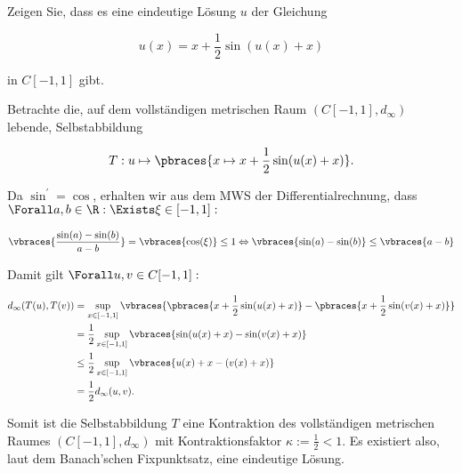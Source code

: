\begin{exercise}

Zeigen Sie, dass es eine eindeutige Lösung $u$ der Gleichung

\begin{equation*}
  u(x) = x + \frac{1}{2}\sin(u(x)+x)
\end{equation*}

in $C[-1,1]$ gibt.

\end{exercise}

\begin{solution}

Betrachte die, auf dem vollständigen metrischen Raum $(C[-1, 1], d_\infty)$ lebende, Selbstabbildung

\begin{equation*}
  T: u \mapsto \pbraces{x \mapsto x + \frac{1}{2}\sin(u(x)+x)}.
\end{equation*}

Da $\sin^\prime = \cos$, erhalten wir aus dem MWS der Differentialrechnung, dass $\Forall a, b \in \R: \Exists \xi \in [-1,1]:$

\begin{align*}
  \vbraces{\frac{\sin(a)-\sin(b)}{a-b}} = \vbraces{\cos(\xi)} \leq 1 \Leftrightarrow
  \vbraces{\sin(a)-\sin(b)} \leq \vbraces{a-b}
\end{align*}

Damit gilt $\Forall u, v \in C[-1, 1]:$

\begin{align*}
  d_\infty(T(u),T(v))
  & = \sup_{x \in [-1, 1]} \vbraces
  {
    \pbraces{x + \frac{1}{2} \sin(u(x) + x)} -
    \pbraces{x + \frac{1}{2} \sin(v(x) + x)}
  } \\
  & = \frac{1}{2} \sup_{x \in [-1, 1]} \vbraces
  {
    \sin(u(x) + x) -
    \sin(v(x) + x)
  } \\
  & \leq \frac{1}{2}
         \sup_{x \in [-1, 1]}
         \vbraces{u(x) + x - (v(x) + x)} \\
  & = \frac{1}{2}
      d_\infty(u, v).
\end{align*}

Somit ist die Selbstabbildung $T$ eine Kontraktion des vollständigen metrischen Raumes $(C[-1, 1], d_\infty)$ mit Kontraktionsfaktor $ \kappa := \frac{1}{2} < 1$. Es existiert also, laut dem Banach'schen Fixpunktsatz, eine
eindeutige Lösung.

\end{solution}
